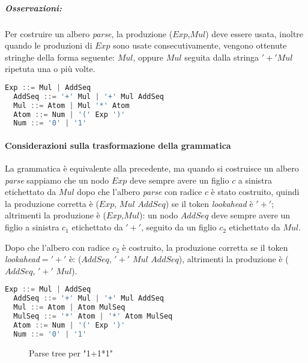 \subparagraph{Osservazioni:}
Per costruire un albero \emph{parse}, la produzione ($Exp$,$Mul$) deve essere
usata, inoltre quando le produzioni di $Exp$ sono usate consecutivamente,
vengono ottenute stringhe della forma seguente: $Mul$, oppure $Mul$ seguita
dalla stringa $'+'Mul$ ripetuta una o più volte.

\begin{lstlisting}[language=Java, caption={Grammatica rivisitata a seguito delle osservazioni precedenti}]
  Exp ::= Mul | AddSeq
  AddSeq ::= '+' Mul | '+' Mul AddSeq
  Mul ::= Atom | Mul '*' Atom
  Atom ::= Num | '(' Exp ')'
  Num ::= '0' | '1'
\end{lstlisting}

\paragraph{Considerazioni sulla trasformazione della grammatica}
La grammatica è equivalente alla precedente, ma quando si costruisce un albero
\emph{parse} sappiamo che un nodo $Exp$ deve sempre avere un figlio $c$ a
sinistra etichettato da $Mul$ dopo che l'albero \emph{parse} con radice $c$ è
stato costruito, quindi la produzione corretta è ($Exp$, $Mul$ $AddSeq$) se
il token \emph{lookahead} è $'+'$;
altrimenti la produzione è ($Exp$,$Mul$): un nodo $AddSeq$ deve sempre avere un
figlio a sinistra $c_1$ etichettato da $'+'$, seguito da un figlio $c_2$
etichettato da $Mul$.

Dopo che l'albero con radice $c_2$  è costruito, la produzione corretta se
il token \emph{lookahead}$='+'$ è: ($AddSeq$, $'+'$ $Mul$ $AddSeq$), altrimenti
la produzione è ($AddSeq$, $'+'$ $Mul$).

\begin{lstlisting}[language=Java, caption={Soluzione completa}]
  Exp ::= Mul | AddSeq
  AddSeq ::= '+' Mul | '+' Mul AddSeq
  Mul ::= Atom | Atom MulSeq
  MulSeq ::= '*' Atom | '*' Atom MulSeq
  Atom ::= Num | '(' Exp ')'
  Num ::= '0' | '1'
\end{lstlisting}

\begin{figure}[H]
\caption{Parse tree per "1+1*1"}
\centering{}\end{figure}


